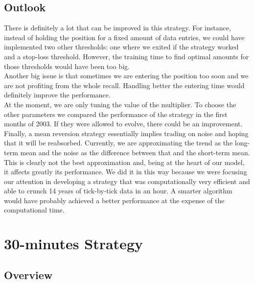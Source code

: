 \documentclass[a4paper]{article}
\begin{document}
\subsection{Outlook}

There is definitely a lot that can be improved in this strategy. For instance, instead of holding the position for a fixed amount of data entries, we could have implemented two other thresholds: one where we exited if the strategy worked and a stop-loss threshold. However, the training time to find optimal amounts for those thresholds would have been too big.\\
Another big issue is that sometimes we are entering the position too soon and we are not profiting from the whole recall. Handling better the entering time would definitely improve the performance.\\
At the moment, we are only tuning the value of the multiplier. To choose the other parameters we compared the performance of the strategy in the first months of 2003. If they were allowed to evolve, there could be an improvement.\\
Finally, a mean reversion strategy essentially implies trading on noise and hoping that it will be reabsorbed. Currently, we are approximating the trend as the long-term mean and the noise as the difference between that and the short-term mean. This is clearly not the best approximation and, being at the heart of our model, it affects greatly its performance. We did it in this way because we were focusing our attention in developing a strategy that was computationally very efficient and able to crunch 14 years of tick-by-tick data in an hour. A smarter algorithm would have probably achieved a better performance at the expense of the computational time.



\section{30-minutes Strategy}

\subsection{Overview}
\end{document}
